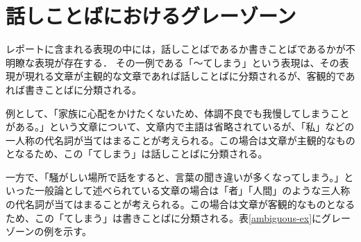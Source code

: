 \section{話しことばにおけるグレーゾーン}
レポートに含まれる表現の中には，話しことばであるか書きことばであるかが不明瞭な表現が存在する．
その一例である「～てしまう」という表現は、その表現が現れる文章が主観的な文章であれば話しことばに分類されるが、客観的であれば書きことばに分類される。

例として、「家族に心配をかけたくないため、体調不良でも我慢してしまうことがある。」という文章について、文章内で主語は省略されているが、「私」などの一人称の代名詞が当てはまることが考えられる。この場合は文章が主観的なものとなるため、この「てしまう」は話しことばに分類される。

一方で、「騒がしい場所で話をすると、言葉の聞き違いが多くなってしまう。」といった一般論として述べられている文章の場合は「者」「人間」のような三人称の代名詞が当てはまることが考えられる。この場合は文章が客観的なものとなるため、この「てしまう」は書きことばに分類される。表\ref{ambiguous-ex}にグレーゾーンの例を示す。



